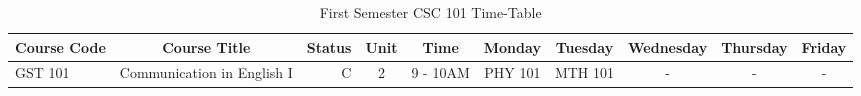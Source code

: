 \documentclass{article}
\begin{document}
	
	\begin{sidewaystable}[h!]
		\begin{center}
			\caption{First Semester CSC 101 Time-Table}
			\label{tab:table1}
			\begin{tabular}{l|c|r|c|c|c|c|c|c|c|}
				\textbf{Course Code} & \textbf{Course Title} & \textbf{Status} & \textbf{Unit} & \textbf{Time} & \textbf{Monday} & \textbf{Tuesday} & \textbf{Wednesday} & \textbf{Thursday} & \textbf{Friday}\\
				\hline
				GST 101 & Communication in English I & C & 2 & 9 - 10AM & PHY 101 & MTH 101 & - & - & - \\ 
				
				 
			\end{tabular}
		\end{center}
	\end{sidewaystable}
\end{document}
